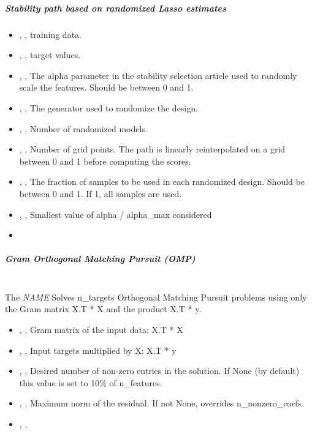 \subparagraph{Stability path based on randomized Lasso estimates}
\mbox{}
\begin{itemize}
  \item {} , ,
  training data.
  \item {} , ,
  target values.
  \item {} , ,
  The alpha parameter in the stability selection article used to randomly scale
  the features.
  Should be between 0 and 1.
  \item {} , ,
  The generator used to randomize the design.
  \item {} , ,
  Number of randomized models.
  \item {} , ,
  Number of grid points.
  The path is linearly reinterpolated on a grid between 0 and 1 before computing
  the scores.
  \item {} , ,
  The fraction of samples to be used in each randomized design.
  Should be between 0 and 1.
  If 1, all samples are used.
  \item {} , ,
  Smallest value of alpha / alpha\_max considered
  \item \verDescriptionB
\end{itemize}

\subparagraph{Gram Orthogonal Matching Pursuit (OMP)}
\mbox{}
\\The \textit{NAME} Solves n\_targets Orthogonal Matching Pursuit
problems using only the Gram matrix X.T * X and the product X.T * y.
%
\begin{itemize}
  \item {} , ,
  Gram matrix of the input data: X.T * X
  \item {} , ,
  Input targets multiplied by X: X.T * y
  \item {}, ,
  Desired number of non-zero entries in the solution.
  If None (by default) this value is set to 10\% of n\_features.
  \item {} , ,
  Maximum norm of the residual.
  If not None, overrides n\_nonzero\_coefs.
  \item {} , ,
\end{itemize}


